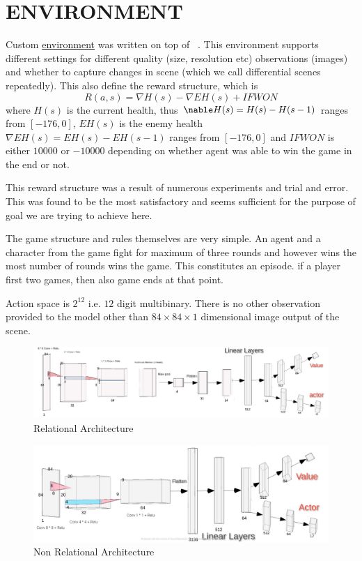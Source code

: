 \documentclass[english]{sobraep}
\begin{document}
\section{ENVIRONMENT}

Custom \href{https://github.com/thunderock/BiasNet/blob/master/environment.py}{environment} was written on top of ~\cite{nichol2018retro}. This environment supports different settings for different quality (size, resolution etc) observations (images) and whether to capture changes in scene (which we call differential scenes repeatedly). This also define the reward structure, which is $$R(a, s) = \nabla H(s) -\nabla EH(s) + IFWON$$ where $H(s)$ is the current health, thus $\nable H(s)=H(s) - H(s - 1)$ ranges from $[-176, 0]$, $EH(s)$ is the enemy health $\nabla EH(s) = EH(s) - EH(s-1)$ ranges from $[-176, 0]$ and $IFWON$ is either $10000$ or $-10000$ depending on whether agent was able to win the game in the end or not. 

This reward structure was a result of numerous experiments and trial and error. This was found to be the most satisfactory and seems sufficient for the purpose of goal we are trying to achieve here.

The game structure and rules themselves are very simple. An agent and a character from the game fight for maximum of three rounds and however wins the most number of rounds wins the game. This constitutes an episode. if a player first two games, then also game ends at that point.

Action space is $2^{12}$ i.e. $12$ digit multibinary. There is no other observation provided to the model other than $84\times84\times1$ dimensional image output of the scene.

\begin{figure}
	\includegraphics[width=\textwidth]{relational.jpg}
	\centering
	\caption{Relational Architecture}
	\label{fig:fig2}
\end{figure}	

\begin{figure}
	\includegraphics[width=\textwidth]{non_relational.jpeg}
	\centering
	\caption{Non Relational Architecture}
	\label{fig:fig3}
\end{figure}	
\end{document}

